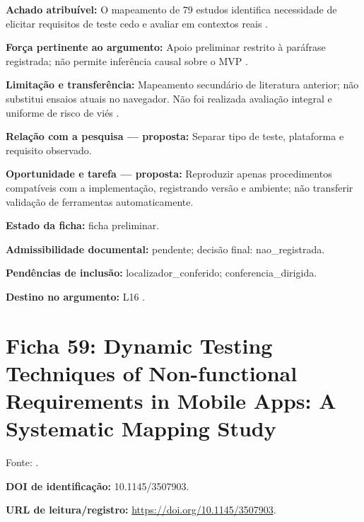 \noindent\textbf{Achado atribuível:} O mapeamento de 79 estudos identifica necessidade de elicitar requisitos de teste cedo e avaliar em contextos reais \citep{eng05}.\par\medskip

\noindent\textbf{Força pertinente ao argumento:} Apoio preliminar restrito à paráfrase registrada; não permite inferência causal sobre o MVP \citep{eng05}.\par\medskip

\noindent\textbf{Limitação e transferência:} Mapeamento secundário de literatura anterior; não substitui ensaios atuais no navegador. Não foi realizada avaliação integral e uniforme de risco de viés \citep{eng05}.\par\medskip

\noindent\textbf{Relação com a pesquisa — proposta:} Separar tipo de teste, plataforma e requisito observado.\par\medskip

\noindent\textbf{Oportunidade e tarefa — proposta:} Reproduzir apenas procedimentos compatíveis com a implementação, registrando versão e ambiente; não transferir validação de ferramentas automaticamente.\par\medskip

\noindent\textbf{Estado da ficha:} ficha preliminar.\par\medskip

\noindent\textbf{Admissibilidade documental:} pendente; decisão final: nao\_registrada.\par\medskip

\noindent\textbf{Pendências de inclusão:} localizador\_conferido; conferencia\_dirigida.\par\medskip

\noindent\textbf{Destino no argumento:} L16 .

\clearpage\section*{Ficha 59: Dynamic Testing Techniques of Non-functional Requirements in Mobile Apps: A Systematic Mapping Study}

Fonte: \citet{eng06}.

\noindent\textbf{DOI de identificação:} 10.1145/3507903.\par\medskip

\noindent\textbf{URL de leitura/registro:} \url{https://doi.org/10.1145/3507903}.\par\medskip


